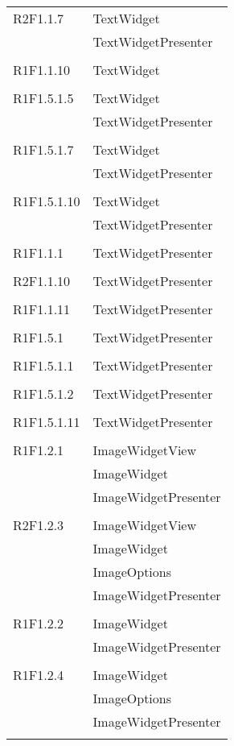 \begin{center}
\begin{longtable}{|p{7cm}|p{5cm}|}
		R2F1.1.7 & TextWidget \\ & TextWidgetPresenter \\ & \\ \hline
		R1F1.1.10 & TextWidget \\ & \\ \hline
		R1F1.5.1.5 & TextWidget \\ & TextWidgetPresenter \\ & \\ \hline
		R1F1.5.1.7 & TextWidget \\ & TextWidgetPresenter \\ & \\ \hline
		R1F1.5.1.10 & TextWidget \\ & TextWidgetPresenter \\ & \\ \hline
		R1F1.1.1 & TextWidgetPresenter \\ & \\ \hline
		R2F1.1.10 & TextWidgetPresenter \\ & \\ \hline
		R1F1.1.11 & TextWidgetPresenter \\ & \\ \hline
		R1F1.5.1 & TextWidgetPresenter \\ & \\ \hline
		R1F1.5.1.1 & TextWidgetPresenter \\ & \\ \hline
		R1F1.5.1.2 & TextWidgetPresenter \\ & \\ \hline
		R1F1.5.1.11 & TextWidgetPresenter \\ & \\ \hline
		R1F1.2.1 & ImageWidgetView \\ & ImageWidget \\ & ImageWidgetPresenter \\ & \\ \hline
		R2F1.2.3 & ImageWidgetView \\ & ImageWidget \\ & ImageOptions \\ & ImageWidgetPresenter \\ & \\ \hline
		R1F1.2.2 & ImageWidget \\ & ImageWidgetPresenter \\ & \\ \hline
		R1F1.2.4 & ImageWidget \\ & ImageOptions \\ & ImageWidgetPresenter \\ & \\ \hline

\end{longtable}
\end{center}
